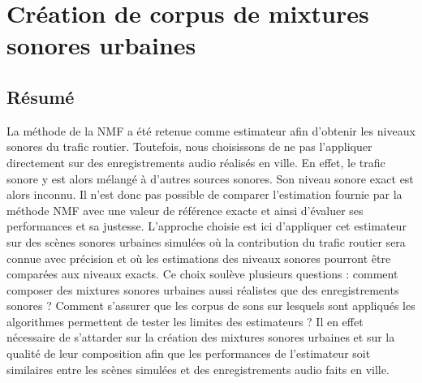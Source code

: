 \chapter{Création de corpus de mixtures sonores urbaines}
\label{chap:corpusSonore}

\section*{\centering Résumé}


\vspace{2cm}

La méthode de la NMF a été retenue comme estimateur afin d'obtenir les niveaux sonores du trafic routier. Toutefois, nous choisissons de ne pas l'appliquer directement sur des enregistrements audio réalisés en ville. En effet, le trafic sonore y est alors mélangé à d'autres sources sonores. Son niveau sonore exact est alors inconnu. Il n'est donc pas possible de comparer l'estimation fournie par la méthode NMF avec une valeur de référence exacte et ainsi d'évaluer ses performances et sa justesse. L'approche choisie est ici d'appliquer cet estimateur sur des scènes sonores urbaines simulées où la contribution du trafic routier sera connue avec précision et où les estimations des niveaux sonores pourront être comparées aux niveaux exacts. Ce choix soulève plusieurs questions : comment composer des mixtures sonores urbaines aussi réalistes que des enregistrements sonores ? Comment s'assurer que les corpus de sons sur lesquels sont appliqués les algorithmes permettent de tester les limites des estimateurs ?
Il en effet nécessaire de s'attarder sur la création des mixtures sonores urbaines et sur la qualité de leur composition afin que les performances de l'estimateur soit similaires entre les scènes simulées et des enregistrements audio faits en ville.

